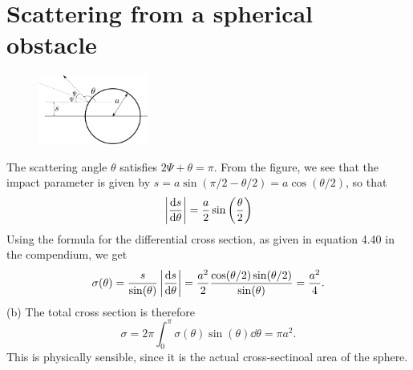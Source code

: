 \documentclass{article}
\begin{document}
    \section{Scattering from a spherical obstacle}
        \begin{figure}
            \vspace{-1cm}
            \includegraphics[width=0.32\textwidth]{figures/figure_2.pdf}
            \vspace{-2cm}
        \end{figure}
        The scattering angle $\theta$ satisfies $2 \Psi + \theta = \pi$. From the figure, we see that the impact parameter is given by $s = a \sin(\pi/2 - \theta /2 ) = a \cos(\theta / 2)$, so that 
        \begin{equation*}
            \left| \dv{s}{\theta} \right| = \frac{a}{2} \sin\left(\frac{\theta}{2}\right)
        \end{equation*}
        Using the formula for the differential cross section, as given in equation 4.40 in the compendium, we get
        \begin{equation*}
            \sigma(\theta) = \frac{s}{\sin(\theta)} \left| \dv{s}{\theta} \right| 
            = \frac{a^2}{2} \frac{\cos(\theta/2)\sin(\theta/2)}{\sin(\theta)}
             =\frac{a^2}{4}.
        \end{equation*}
        (b) The total cross section is therefore
        \begin{equation*}
            \sigma = 2 \pi \int_0^{\pi} \sigma(\theta) \sin(\theta) \dd \theta = \pi a^2.
        \end{equation*}
        This is physically sensible, since it is the actual cross-sectinoal area of the sphere.
\end{document}

